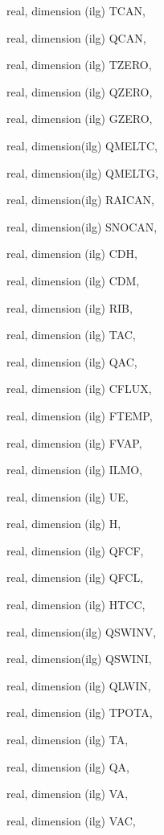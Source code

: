 {\begin{DoxyParamCaption}
\item[{real, dimension  (ilg)}]{T\+C\+A\+N, }
\item[{real, dimension  (ilg)}]{Q\+C\+A\+N, }
\item[{real, dimension (ilg)}]{T\+Z\+E\+R\+O, }
\item[{real, dimension (ilg)}]{Q\+Z\+E\+R\+O, }
\item[{real, dimension (ilg)}]{G\+Z\+E\+R\+O, }
\item[{real, dimension(ilg)}]{Q\+M\+E\+L\+T\+C, }
\item[{real, dimension(ilg)}]{Q\+M\+E\+L\+T\+G, }
\item[{real, dimension(ilg)}]{R\+A\+I\+C\+A\+N, }
\item[{real, dimension(ilg)}]{S\+N\+O\+C\+A\+N, }
\item[{real, dimension   (ilg)}]{C\+D\+H, }
\item[{real, dimension   (ilg)}]{C\+D\+M, }
\item[{real, dimension   (ilg)}]{R\+I\+B, }
\item[{real, dimension   (ilg)}]{T\+A\+C, }
\item[{real, dimension   (ilg)}]{Q\+A\+C, }
\item[{real, dimension (ilg)}]{C\+F\+L\+U\+X, }
\item[{real, dimension (ilg)}]{F\+T\+E\+M\+P, }
\item[{real, dimension  (ilg)}]{F\+V\+A\+P, }
\item[{real, dimension  (ilg)}]{I\+L\+M\+O, }
\item[{real, dimension    (ilg)}]{U\+E, }
\item[{real, dimension     (ilg)}]{H, }
\item[{real, dimension  (ilg)}]{Q\+F\+C\+F, }
\item[{real, dimension  (ilg)}]{Q\+F\+C\+L, }
\item[{real, dimension  (ilg)}]{H\+T\+C\+C, }
\item[{real, dimension(ilg)}]{Q\+S\+W\+I\+N\+V, }
\item[{real, dimension(ilg)}]{Q\+S\+W\+I\+N\+I, }
\item[{real, dimension (ilg)}]{Q\+L\+W\+I\+N, }
\item[{real, dimension (ilg)}]{T\+P\+O\+T\+A, }
\item[{real, dimension    (ilg)}]{T\+A, }
\item[{real, dimension    (ilg)}]{Q\+A, }
\item[{real, dimension    (ilg)}]{V\+A, }
\item[{real, dimension   (ilg)}]{V\+A\+C, }

\end{DoxyParamCaption}}
